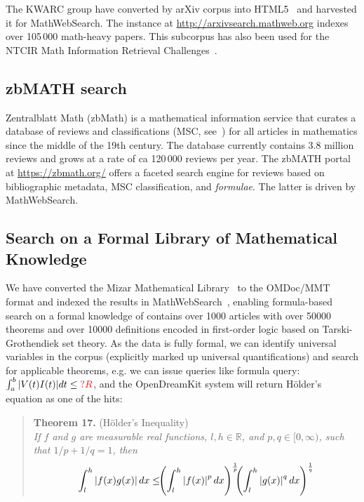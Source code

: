 \documentclass{deliverablereport}
\def\pn{OpenDreamKit\xspace}
\def\MWS{\textsf{MathWebSearch}\xspace}
\begin{document}
The KWARC group have converted by arXiv corpus into HTML5~\cite{StaKoh:tlcspx10} and
harvested it for \MWS. The instance at \url{http://arxivsearch.mathweb.org}
indexes over 105\,000 math-heavy papers. This subcorpus has also been used for the NTCIR
Math Information Retrieval
Challenges~\cite{AizKohOun:nmpto13,AizKohOunSch:nmto14,AizKohOunSch:nmto16}.

\subsection{zbMATH search}

Zentralblatt Math (zbMath) is a mathematical information service that curates a database
of reviews and classifications (MSC, see~\cite{MSC2010}) for all articles in mathematics
since the middle of the 19th century. The database currently contains 3.8 million reviews
and grows at a rate of ca 120\,000 reviews per year. The zbMATH portal at
\url{https://zbmath.org/} offers a faceted search engine for reviews based on
bibliographic metadata, MSC classification, and \emph{formulae}. The latter is driven by
\MWS.

\subsection{Search on a Formal Library of Mathematical Knowledge}

We have converted the Mizar Mathematical Library~\cite{MizarKB:on} to the OMDoc/MMT format
and indexed the results in \MWS~\cite{IanKohRabUrb:tmmliotaa13}, enabling
formula-based search on a formal knowledge of contains over 1000 articles with over 50000
theorems and over 10000 definitions encoded in first-order logic based on
Tarski-Grothendiek set theory. As the data is fully formal, we can identify universal
variables in the corpus (explicitly marked up universal quantifications) and search for
applicable theorems, e.g. we can issue queries like formula query:
\def\var#1{\textcolor{red}{?#1}} $\int_a^b |V(t)I(t)| dt\leq\var{R}$, and the \pn system
will return H\"older's equation as one of the hits:
\begin{quote}
  \textbf{Theorem 17.} (H\"older's Inequality)\\\it
  If $f$ and $g$ are measurable real functions, $l,h\in\mathbb{R}$, and  $p,q\in
  [0,\infty)$, such that $1/p + 1/q = 1$, then 
  \begin{equation}\label{eq:hi}
  \int_l^h \left|f(x)g(x)\right| dx \leq\kern-.4em 
    \left(\int_l^h\left|f(x)\right|^p dx\right)^\frac{1}{p} 
    \kern-.5em
    \left(\int_l^h\left|g(x)\right|^q dx \right)^\frac{1}{q}
  \end{equation}
\end{quote}
\end{document}
